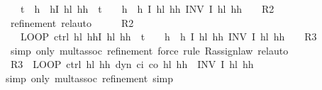 \documentclass[envcountsame,envcountsect]{llncs}
\begin{document}
\begin{example}
\begin{isabellebody}
\ \ \ {\isacharparenleft}{\isacharparenleft}t\ {\isacharcolon}{\isacharcolon}{\isacharequal}\ {}{\isacharparenright}{\isacharsemicolon}{\isacharparenleft}h\ {\isacharcolon}{\isacharcolon}{\isacharequal}\ h{\isacharparenright}{\isacharsemicolon}\isactrlbold {\isacharbrackleft}I\ h\isactrlsub l\ h\isactrlsub h\ {\isasymand}\ t\ {\isacharequal}\ {}\ {\isasymand}\ h\ {\isacharequal}\ h{\isacharcomma}\ I\ h\isactrlsub l\ h\isactrlsub h\isactrlbold {\isacharbrackright}{\isacharparenright}\ INV\ I\ h\isactrlsub l\ h\isactrlsub h{\isachardoublequoteclose}\ {\isacharparenleft}\ {\isachardoublequoteopen}{\isacharunderscore}\ {\isasymge}\ {\isacharquery}R2{\isachardoublequoteclose}{\isacharparenright}\isanewline
\ \ \ \ \isamarkupfalse%
\ {\isacharparenleft}refinement{\isacharcomma}\ rel{\isacharunderscore}auto{\isacharprime}{\isacharparenright}\isanewline
\ \ \isamarkupfalse%
\ \isamarkupfalse%
\ {\isachardoublequoteopen}{\isacharquery}R2\ {\isasymge}\isanewline
\ \ \ LOOP\ {\isacharparenleft}ctrl\ h\isactrlsub l\ h\isactrlsub h{\isacharsemicolon}\isactrlbold {\isacharbrackleft}I\ h\isactrlsub l\ h\isactrlsub h\ {\isasymand}\ t\ {\isacharequal}\ {}\ {\isasymand}\ h\ {\isacharequal}\ h{\isacharcomma}\ I\ h\isactrlsub l\ h\isactrlsub h\isactrlbold {\isacharbrackright}{\isacharparenright}\ INV\ I\ h\isactrlsub l\ h\isactrlsub h{\isachardoublequoteclose}\ {\isacharparenleft}\ {\isachardoublequoteopen}{\isacharunderscore}\ {\isasymge}\ {\isacharquery}R3{\isachardoublequoteclose}{\isacharparenright}\isanewline
\ \ \ \ \isamarkupfalse%
\ {\isacharparenleft}simp\ only{\isacharcolon}\ mult{\isachardot}assoc{\isacharcomma}\ refinement{\isacharsemicolon}\ {\isacharparenleft}force{\isacharparenright}{\isacharquery}{\isacharcomma}\ {\isacharparenleft}rule\ R{\isacharunderscore}assign{\isacharunderscore}law{\isacharparenright}{\isacharquery}{\isacharparenright}\ rel{\isacharunderscore}auto{\isacharprime}\isanewline
\ \ \isamarkupfalse%
\ \isamarkupfalse%
\ {\isachardoublequoteopen}{\isacharquery}R3\ {\isasymge}\ LOOP\ {\isacharparenleft}ctrl\ h\isactrlsub l\ h\isactrlsub h{\isacharsemicolon}\ dyn\ c\isactrlsub i\ c\isactrlsub o\ h\isactrlsub l\ h\isactrlsub h\ {\isasymtau}{\isacharparenright}\ INV\ I\ h\isactrlsub l\ h\isactrlsub h{\isachardoublequoteclose}\isanewline
\ \ \ \ \isamarkupfalse%
{\isacharparenleft}simp\ only{\isacharcolon}\ mult{\isachardot}assoc{\isacharcomma}\ refinement{\isacharsemicolon}\ {\isacharparenleft}simp{\isacharparenright}{\isacharquery}{\isacharparenright}\isanewline

\end{isabellebody}
\end{example}
\end{document}
